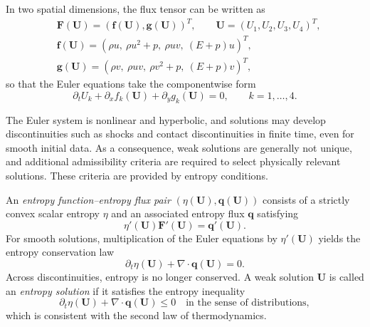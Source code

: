 \documentclass[fleqn,11pt]{amsart}
\begin{document}
In two spatial dimensions, the flux tensor can be written as
\begin{equation}
\label{flux-c}
\begin{aligned}
&\bm F(\bm U)=(\bm f(\bm U),\bm g(\bm U))^T,\qquad
\bm U=(U_1,U_2,U_3,U_4)^T,\\
&\bm f(\bm U)=(\rho u,\ \rho u^2+p,\ \rho uv,\ (E+p)u)^T,\\
&\bm g(\bm U)=(\rho v,\ \rho uv,\ \rho v^2+p,\ (E+p)v)^T,
\end{aligned}
\end{equation}
so that the Euler equations take the componentwise form
\begin{equation}
\label{euler-c}
\partial_t U_k+\partial_x f_k(\bm U)+\partial_y g_k(\bm U)=0,
\qquad k=1,\dots,4.
\end{equation}

The Euler system is nonlinear and hyperbolic, and solutions may develop
discontinuities such as shocks and contact discontinuities in finite
time, even for smooth initial data. As a consequence, weak solutions
are generally not unique, and additional admissibility criteria are
required to select physically relevant solutions. These criteria are
provided by entropy conditions.

An \emph{entropy function--entropy flux pair}
$(\eta(\bm U),\bm q(\bm U))$ consists of a strictly convex scalar entropy
$\eta$ and an associated entropy flux $\bm q$ satisfying
\begin{equation}
\eta'(\bm U)\bm F'(\bm U)=\bm q'(\bm U).
\end{equation}
For smooth solutions, multiplication of the Euler equations by
$\eta'(\bm U)$ yields the entropy conservation law
\begin{equation}
\partial_t\eta(\bm U)+\nabla\cdot\bm q(\bm U)=0.
\end{equation}
Across discontinuities, entropy is no longer conserved. A weak solution
$\bm U$ is called an \emph{entropy solution} if it satisfies the entropy
inequality
\begin{equation}
\partial_t\eta(\bm U)+\nabla\cdot\bm q(\bm U)\le0
\quad\text{in the sense of distributions},
\end{equation}
which is consistent with the second law of thermodynamics.
\end{document}

